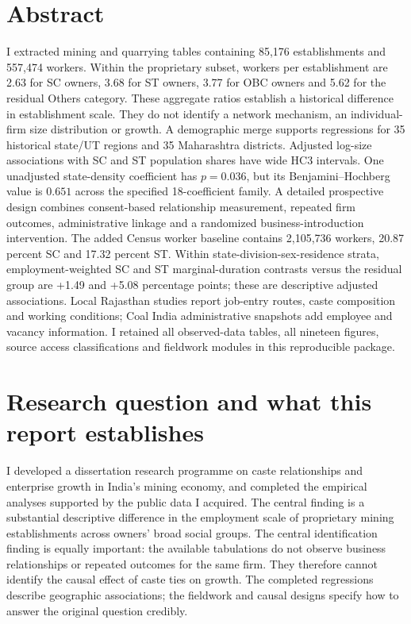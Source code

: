 \documentclass[11pt,a4paper]{report}
\begin{document}
\chapter*{Abstract}
I extracted mining and quarrying tables containing 85,176 establishments and 557,474 workers. Within the proprietary subset, workers per establishment are 2.63 for SC owners, 3.68 for ST owners, 3.77 for OBC owners and 5.62 for the residual Others category. These aggregate ratios establish a historical difference in establishment scale. They do not identify a network mechanism, an individual-firm size distribution or growth. A demographic merge supports regressions for 35 historical state/UT regions and 35 Maharashtra districts. Adjusted log-size associations with SC and ST population shares have wide HC3 intervals. One unadjusted state-density coefficient has $p=0.036$, but its Benjamini--Hochberg value is $0.651$ across the specified 18-coefficient family. A detailed prospective design combines consent-based relationship measurement, repeated firm outcomes, administrative linkage and a randomized business-introduction intervention. The added Census worker baseline contains 2,105,736 workers, 20.87 percent SC and 17.32 percent ST. Within state-division-sex-residence strata, employment-weighted SC and ST marginal-duration contrasts versus the residual group are +1.49 and +5.08 percentage points; these are descriptive adjusted associations. Local Rajasthan studies report job-entry routes, caste composition and working conditions; Coal India administrative snapshots add employee and vacancy information. I retained all observed-data tables, all nineteen figures, source access classifications and fieldwork modules in this reproducible package.
\tableofcontents\listoffigures\listoftables\clearpage
{}

\chapter{Research question and what this report establishes}
I developed a dissertation research programme on caste relationships and enterprise growth in India's mining economy, and completed the empirical analyses supported by the public data I acquired. The central finding is a substantial descriptive difference in the employment scale of proprietary mining establishments across owners' broad social groups. The central identification finding is equally important: the available tabulations do not observe business relationships or repeated outcomes for the same firm. They therefore cannot identify the causal effect of caste ties on growth. The completed regressions describe geographic associations; the fieldwork and causal designs specify how to answer the original question credibly.
\end{document}
